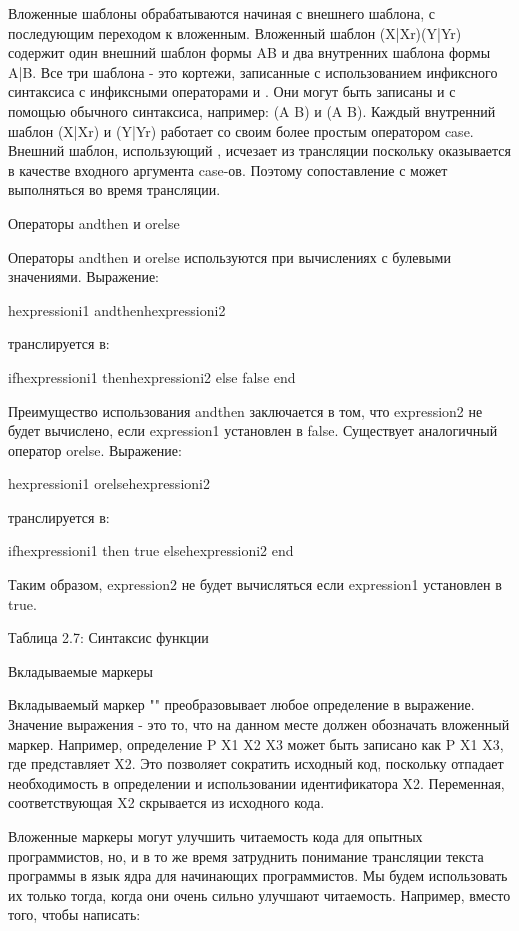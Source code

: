 Вложенные шаблоны обрабатываются начиная с внешнего шаблона, с последующим переходом к вложенным. Вложенный шаблон (X|Xr)(Y|Yr) содержит один внешний шаблон формы AB и два внутренних шаблона формы A|B. Все три шаблона - это кортежи, записанные с использованием инфиксного синтаксиса с инфиксными операторами  и . Они могут быть записаны и с помощью обычного синтаксиса, например: (A B) и (A B). Каждый внутренний шаблон  (X|Xr) и (Y|Yr) работает со своим более простым оператором case. Внешний шаблон, использующий , исчезает из трансляции поскольку оказывается в качестве входного аргумента case-ов. Поэтому сопоставление с  может выполняться во время трансляции.

Операторы andthen и orelse

Операторы andthen и orelse используются при вычислениях с булевыми значениями. Выражение:

hexpressioni1 andthenhexpressioni2

транслируется в:

ifhexpressioni1 thenhexpressioni2 else false end

Преимущество использования andthen заключается в том, что expression2 не будет вычислено, если expression1 установлен в false. Существует аналогичный оператор orelse. Выражение:

hexpressioni1 orelsehexpressioni2

транслируется в:

ifhexpressioni1 then true elsehexpressioni2 end

Таким образом, expression2 не будет вычисляться если expression1 установлен в true.

Таблица 2.7: Синтаксис функции

Вкладываемые маркеры

Вкладываемый маркер "" преобразовывает любое определение в выражение. Значение выражения - это то, что на данном месте должен обозначать вложенный маркер. Например, определение {P X1 X2 X3} может быть записано как {P X1 X3}, где  представляет X2. Это позволяет сократить исходный код, поскольку отпадает необходимость в определении и использовании идентификатора X2. Переменная, соответствующая X2 скрывается из исходного кода.

Вложенные маркеры могут улучшить читаемость кода для опытных программистов, но, и в то же время затруднить понимание трансляции текста программы в язык ядра для начинающих программистов. Мы будем использовать их только тогда, когда они очень сильно улучшают читаемость. Например, вместо того, чтобы написать:

